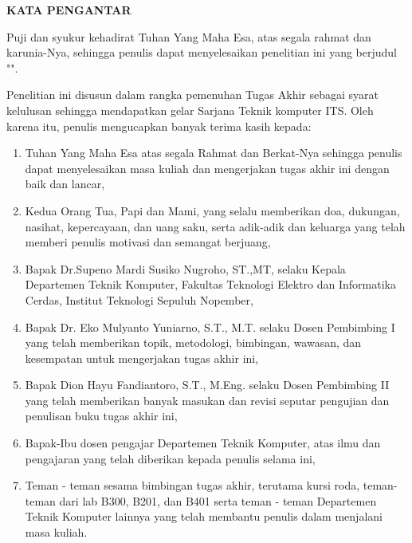 \begin{center}
  \Large
  \textbf{KATA PENGANTAR}
\end{center}


\vspace{2ex}


Puji dan syukur kehadirat Tuhan Yang Maha Esa, atas segala rahmat dan karunia-Nya,
sehingga penulis dapat menyelesaikan penelitian ini yang berjudul
"\tatitle".

Penelitian ini disusun dalam rangka pemenuhan Tugas Akhir sebagai syarat kelulusan sehingga mendapatkan gelar Sarjana Teknik komputer ITS. Oleh karena itu, penulis mengucapkan banyak terima kasih kepada:

\begin{enumerate}[nolistsep]
  \item Tuhan Yang Maha Esa atas segala Rahmat dan Berkat-Nya sehingga penulis dapat menyelesaikan masa kuliah dan mengerjakan tugas akhir ini dengan baik dan lancar,

  \item Kedua Orang Tua, Papi dan Mami, yang selalu memberikan doa, dukungan, nasihat, kepercayaan, dan uang saku, serta adik-adik dan keluarga yang telah memberi penulis motivasi dan semangat berjuang,

  \item Bapak Dr.Supeno Mardi Susiko Nugroho, ST.,MT, selaku Kepala Departemen Teknik Komputer, Fakultas Teknologi Elektro dan Informatika Cerdas, Institut Teknologi Sepuluh Nopember,

  \item Bapak Dr. Eko Mulyanto Yuniarno, S.T., M.T. selaku Dosen Pembimbing I yang telah memberikan topik, metodologi, bimbingan, wawasan, dan kesempatan untuk mengerjakan tugas akhir ini,

  \item Bapak Dion Hayu Fandiantoro, S.T., M.Eng. selaku Dosen Pembimbing II yang telah memberikan banyak masukan dan revisi seputar pengujian dan penulisan buku tugas akhir ini,

  \item Bapak-Ibu dosen pengajar Departemen Teknik Komputer, atas ilmu dan pengajaran yang telah diberikan kepada penulis selama ini,
  
  \item Teman - teman sesama bimbingan tugas akhir, terutama kursi roda, teman-teman dari lab B300, B201, dan B401 serta teman - teman Departemen Teknik Komputer lainnya yang telah membantu penulis dalam menjalani masa kuliah.

\end{enumerate}

